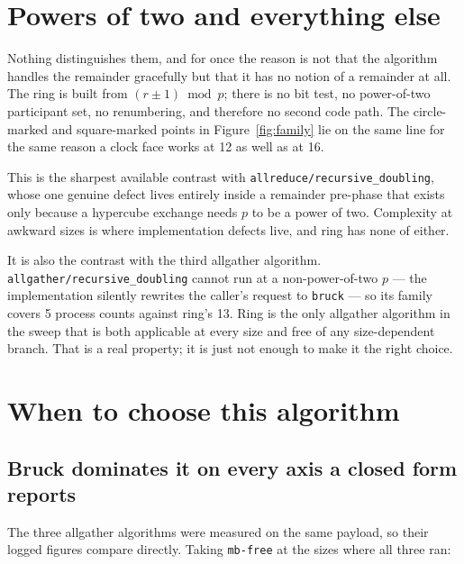 \documentclass[11pt]{article}
\begin{document}
\section{Powers of two and everything else}

Nothing distinguishes them, and for once the reason is not that the algorithm handles the
remainder gracefully but that it has no notion of a remainder at all. The ring is built from
$(r \pm 1) \bmod p$; there is no bit test, no power-of-two participant set, no renumbering, and
therefore no second code path. The circle-marked and square-marked points in
Figure~\ref{fig:family} lie on the same line for the same reason a clock face works at 12 as
well as at 16.

This is the sharpest available contrast with \texttt{allreduce/recursive\_doubling}, whose one
genuine defect lives entirely inside a remainder pre-phase that exists only because a hypercube
exchange needs $p$ to be a power of two. Complexity at awkward sizes is where implementation
defects live, and ring has none of either.

It is also the contrast with the third allgather algorithm.
\texttt{allgather/recursive\_doubling} cannot run at a non-power-of-two $p$ --- the implementation
silently rewrites the caller's request to \texttt{bruck} --- so its family covers 5 process counts
against ring's 13. Ring is the only allgather algorithm in the sweep that is both applicable at
every size and free of any size-dependent branch. That is a real property; it is just not enough
to make it the right choice.

\section{When to choose this algorithm}

\subsection{Bruck dominates it on every axis a closed form reports}

The three allgather algorithms were measured on the same payload, so their logged figures compare
directly. Taking \texttt{mb-free} at the sizes where all three ran:
\end{document}
